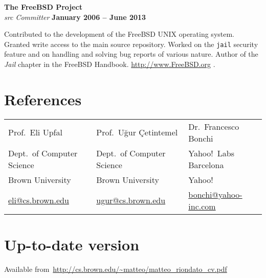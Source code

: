 \documentclass[margin,line]{resume}
\begin{document}
{\bf The FreeBSD Project}\\
{\em \textrm{src} Committer} \hfill {\bf January 2006 -- June 2013}

\begin{list2}
\vspace*{.05in}
\item Contributed to the development of the FreeBSD UNIX operating system.
  Granted write access to the main source repository. Worked on the
  \texttt{jail} security feature and on handling and solving bug reports of
  various nature. Author of the \emph{Jail} chapter in the FreeBSD Handbook.
  \url{http://www.FreeBSD.org} .
\end{list2}

\section {\sc References}
\begin{table}[h!]
  \centering
  \begin{tabular}{lll}
    Prof.~Eli Upfal & Prof.~U\u{g}ur \c{C}etintemel & Dr.~Francesco Bonchi \\
    Dept.~of Computer Science & Dept.~of Computer Science & Yahoo!~Labs Barcelona
    \\
    Brown University & Brown University & Yahoo! \\
    \url{eli@cs.brown.edu} & \url{ugur@cs.brown.edu} &
    \url{bonchi@yahoo-inc.com} \\
  \end{tabular}
\end{table}

\iffalse
\section {\sc Technical Skills}
{\bf Programming Languages}
\begin{list2}
\vspace*{.05in}
\item Fluent in the following languages: C/C++, Python, Java, and bash.
\end{list2}

{\bf Operating Systems}
\begin{list2}
  \vspace*{.05in}
\item Expert user and administrator of FreeBSD systems and various flavours of GNU/Linux
  distributions.
\end{list2}

\section {\sc Citizenship}

Italian

\section{\sc Updated}
\today
\fi

\section{\sc Up-to-date version} Available from~\url{http://cs.brown.edu/~matteo/matteo\_riondato\_cv.pdf}
\end{document}
